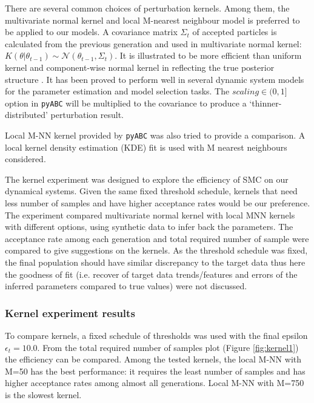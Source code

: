 There are several common choices of perturbation kernels. Among them, the multivariate normal kernel and local M-nearest neighbour model is preferred to be applied to our models. A covariance matrix $\Sigma_t$ of accepted particles is calculated from the previous generation and used in multivariate normal kernel: $K(\theta|\theta_{t-1})\sim\mathcal{N}(\theta_{t-1}, \Sigma_t)$. It is illustrated to be more efficient than uniform kernel and component-wise normal kernel in reflecting the true posterior structure \cite{ref:kernel}. It has been proved to perform well in several dynamic system models \cite{ref:abcsysbio, ref:compare, ref:disease} for the parameter estimation and model selection tasks. The $scaling\in(0,1]$ option in \verb|pyABC| will be multiplied to the covariance to produce a `thinner-distributed' perturbation result.

Local M-NN kernel provided by \verb|pyABC| was also tried to provide a comparison. A local kernel density estimation (KDE) fit is used with M nearest neighbours considered.

The kernel experiment was designed to explore the efficiency of SMC on our dynamical systems. Given the same fixed threshold schedule, kernels that need less number of samples and have higher acceptance rates would be our preference. The experiment compared multivariate normal kernel with local MNN kernels with different options, using synthetic data to infer back the parameters. The acceptance rate among each generation and total required number of sample were compared to give suggestions on the kernels. As the threshold schedule was fixed, the final population should have similar discrepancy to the target data thus here the goodness of fit (i.e. recover of target data trends/features and errors of the inferred parameters compared to true values) were not discussed.

\subsubsection{Kernel experiment results}

To compare kernels, a fixed schedule of thresholds was used with the final epsilon $\epsilon_t=10.0$. From the total required number of samples plot (Figure \ref{fig:kernel1}) the efficiency can be compared. Among the tested kernels, the local M-NN with M=50 has the best performance: it requires the least number of samples and
has higher acceptance rates among almost all generations. Local M-NN with M=750 is the slowest kernel.

